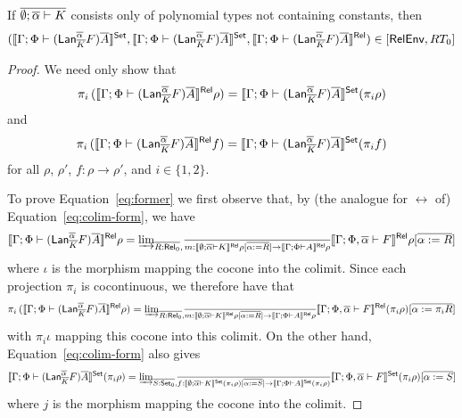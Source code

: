 \documentclass{lmcs}
\theoremstyle{plain}\newtheorem{satz}[thm]{Satz}
\newcommand{\set}{\mathsf{Set}}
\begin{document}
\begin{prop}
If $\overline{\emptyset; \overline{\alpha} \vdash K}$ consists only of
polynomial types not containing constants, then
\[(\setsem{ \Gamma; \Phi \vdash (\Lan^{\ol \alpha}_{\ol{K}} F)\ol{A}
}, \setsem{ \Gamma; \Phi \vdash (\Lan^{\ol \alpha}_{\ol{K}} F)\ol{A} },
\relsem{ \Gamma; \Phi \vdash (\Lan^{\ol \alpha}_{\ol{K}} F)\ol{A} }) \in
[\relenv,RT_0]\]
\end{prop}
\begin{proof}
We need only show that
\begin{equation}\label{eq:former}
\pi_i \,( \relsem{ \Gamma; \Phi \vdash (\Lan^{\ol \alpha}_{\ol{K}} F)\ol{A}
} \rho ) = \setsem{ \Gamma; \Phi \vdash (\Lan^{\ol \alpha}_{\ol{K}}
  F)\ol{A} } (\pi_i \rho)
\end{equation}
and
\begin{equation}\label{eq:latter}
\pi_i \,( \relsem{ \Gamma; \Phi \vdash (\Lan^{\ol \alpha}_{\ol{K}} F)\ol{A}
} f ) = \setsem{ \Gamma; \Phi \vdash (\Lan^{\ol \alpha}_{\ol{K}}
  F)\ol{A} } (\pi_i f)
\end{equation}
for all $\rho$, $\rho'$, $f : \rho \to \rho'$, and $i \in \{1, 2\}$.

To prove Equation~\ref{eq:former} we first observe that, by (the
analogue for $\rel$ of) Equation~\ref{eq:colim-form}, we have
\[
\llbracket{ \Gamma; \Phi \vdash (\mathsf{Lan}^{\overline{\alpha}}_{\overline{K}} F)\overline{A} }\rrbracket^{\mathsf{Rel}} \rho =
{{\underrightarrow{\lim}}_{\overline{R : \mathsf{Rel}_0},\, \overline{m : \llbracket{ \emptyset; \overline{\alpha} \vdash K }\rrbracket^{\mathsf{Rel}}
    \rho[\overline{\alpha := R}] \to \llbracket{ \Gamma; \Phi \vdash A }\rrbracket^{\mathsf{Rel}}
    \rho}}{ \llbracket{ \Gamma; \Phi, \overline{\alpha} \vdash F }\rrbracket^{\mathsf{Rel}}
  \rho[\overline{\alpha := R}] }}
\]
where $\iota$ is the morphism mapping the cocone into the colimit.
Since each projection $\pi_i$ is cocontinuous, we therefore have that 
\[
\pi_i\, ( \llbracket{ \Gamma; \Phi \vdash (\mathsf{Lan}^{\overline{\alpha}}_{\overline{K}}
  F)\overline{A} }\rrbracket^{\mathsf{Rel}} \rho ) = {{\underrightarrow{\lim}}_{\overline{R : \mathsf{Rel}_0}, \overline{m : \llbracket{
      \emptyset; \overline{\alpha} \vdash K }\rrbracket^{\mathsf{Rel}} \rho[\overline{\alpha := R}] \to
    \llbracket{ \Gamma; \Phi \vdash A }\rrbracket^{\mathsf{Rel}} \rho}}{ \llbracket{ \Gamma; \Phi,
    \overline{\alpha} \vdash F }\rrbracket^{\mathsf{Rel}} (\pi_i \rho) [\overline{\alpha := \pi_i R}]}}
\]
with $\pi_i \iota$ mapping this cocone into this colimit.  On the
other hand, Equation~\ref{eq:colim-form} also gives
\[
\setsem{ \Gamma; \Phi \vdash (\Lan^{\ol \alpha}_{\ol{K}} F)\ol{A} }
(\pi_i \rho) = \colim{\ol{S : \set_0}, \ol{f : \setsem{ \emptyset;
      \ol\alpha \vdash K } (\pi_i \rho)[\ol{\alpha := S}] \to \setsem{
      \Gamma; \Phi \vdash A } (\pi_i \rho)}}{ \setsem{ \Gamma; \Phi,
    \ol\alpha \vdash F } (\pi_i \rho) [\ol{\alpha := S}]}
\]
where $j$ is the morphism mapping the cocone into the colimit.


\end{proof}
\end{document}
